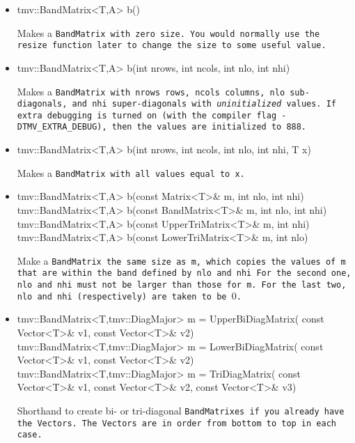 \begin{itemize}

\item
\begin{tmvcode}
tmv::BandMatrix<T,A> b()
\end{tmvcode}
Makes a \tt{BandMatrix} with zero size.  You would normally use the \tt{resize} function later to
change the size to some useful value.

\item 
\begin{tmvcode}
tmv::BandMatrix<T,A> b(int nrows, int ncols, 
      int nlo, int nhi)
\end{tmvcode}
Makes a \tt{BandMatrix} with \tt{nrows} rows, \tt{ncols} columns, 
\tt{nlo} sub-diagonals,
and \tt{nhi} super-diagonals with {\em uninitialized} values.
If extra debugging is turned on (with the compiler flag \tt{-DTMV\_EXTRA\_DEBUG}), then the values are initialized to 888.

\item
\begin{tmvcode}
tmv::BandMatrix<T,A> b(int nrows, int ncols, 
      int nlo, int nhi, T x)
\end{tmvcode}
Makes a \tt{BandMatrix} with all values equal to \tt{x}.

\item 
\begin{tmvcode}
tmv::BandMatrix<T,A> b(const Matrix<T>& m, int nlo, int nhi)
tmv::BandMatrix<T,A> b(const BandMatrix<T>& m, int nlo, int nhi)
tmv::BandMatrix<T,A> b(const UpperTriMatrix<T>& m, int nhi)
tmv::BandMatrix<T,A> b(const LowerTriMatrix<T>& m, int nlo)
\end{tmvcode}
Make a \tt{BandMatrix} the same size as \tt{m}, which copies the values of \tt{m}
that are within the band defined by \tt{nlo} and \tt{nhi}
For the second one, \tt{nlo} and \tt{nhi} must not be larger than those for \tt{m}.
For the last two, \tt{nlo} and \tt{nhi} (respectively) are taken to be $0$.

\item
\begin{tmvcode}
tmv::BandMatrix<T,tmv::DiagMajor> m = UpperBiDiagMatrix(
      const Vector<T>& v1, const Vector<T>& v2)
tmv::BandMatrix<T,tmv::DiagMajor> m = LowerBiDiagMatrix(
      const Vector<T>& v1, const Vector<T>& v2)
tmv::BandMatrix<T,tmv::DiagMajor> m = TriDiagMatrix(
      const Vector<T>& v1,  const Vector<T>& v2, 
      const Vector<T>& v3)
\end{tmvcode}
Shorthand to create bi- or tri-diagonal \tt{BandMatrix}es if you already have the 
\tt{Vector}s.  The \tt{Vector}s are in order from bottom to top in each case.


\end{itemize}
